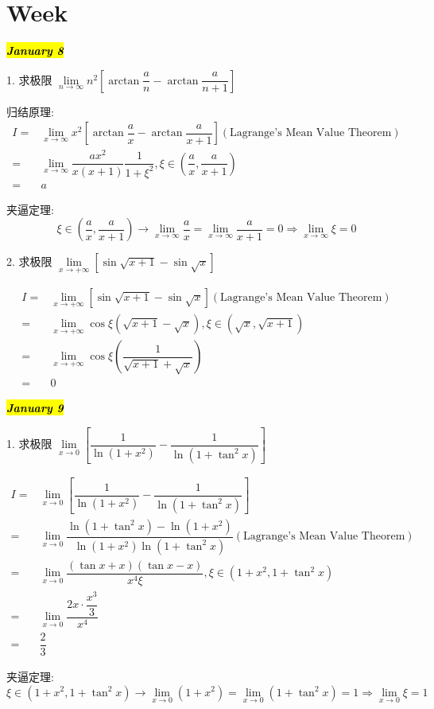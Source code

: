 \section{Week }
\hl{\textbf{\textit{January 8}}}

1. 求极限 $\lim\limits_{n\to \infty}n^{2}\left[\arctan\dfrac{a}{n}-\arctan \dfrac{a}{n+1}\right]$
\begin{solution}
	
	归结原理:
	\begin{align*}
		I = & \lim\limits_{x\to \infty}x^{2}[\arctan\dfrac{a}{x}-\arctan \dfrac{a}{x+1}](\text{Lagrange's Mean Value Theorem})\\
		  = & \lim\limits_{x\to \infty}\dfrac{ax^{2}}{x(x+1)}\dfrac{1}{1+\xi^{2}},\xi\in(\dfrac{a}{x},\dfrac{a}{x+1})\\
		  = & a
	\end{align*}

	夹逼定理: 
	$$\xi\in (\dfrac{a}{x},\dfrac{a}{x+1})\to \lim\limits_{x\to \infty}\dfrac{a}{x} = \lim\limits_{x\to \infty}\dfrac{a}{x+1}=0\Rightarrow \lim\limits_{x\to \infty}\xi = 0$$
\end{solution}

2. 求极限 $\lim\limits_{x\to +\infty}[\sin\sqrt{x+1}-\sin\sqrt{x}]$
\begin{solution}
	
	\begin{align*}
		I = & \lim\limits_{x\to +\infty}[\sin\sqrt{x+1}-\sin\sqrt{x}](\text{Lagrange's Mean Value Theorem})\\
		  = & \lim\limits_{x\to +\infty}\cos \xi(\sqrt{x+1}-\sqrt{x}),\xi\in(\sqrt{x},\sqrt{x+1})\\
		  = & \lim\limits_{x\to +\infty}\cos \xi(\dfrac{1}{\sqrt{x+1}+\sqrt{x}})\\
		  = & 0
	\end{align*}
\end{solution}

\hl{\textbf{\textit{January 9}}}

1. 求极限 $\lim\limits_{x\to 0}\left[\dfrac{1}{\ln(1+x^{2})}-\dfrac{1}{\ln(1+\tan^{2}x)}\right]$
\begin{solution}
	
	\begin{align*}
		I = & \lim\limits_{x\to 0}\left[\dfrac{1}{\ln(1+x^{2})}-\dfrac{1}{\ln(1+\tan^{2}x)}\right]\\
		  = & \lim\limits_{x\to 0}\dfrac{\ln(1+\tan^{2}x)-\ln(1+x^{2})}{\ln(1+x^{2})\ln(1+\tan^{2}x)}(\text{Lagrange's Mean Value Theorem})\\
		  = & \lim\limits_{x\to 0}\dfrac{(\tan x+x)(\tan x-x)}{x^{4}\xi}, \xi\in(1+x^{2},1+\tan^{2}x)\\
		  = & \lim\limits_{x\to 0}\dfrac{2x\cdot \dfrac{x^{3}}{3}}{x^{4}}\\
		  = & \dfrac{2}{3}
	\end{align*}

	夹逼定理: 
	$$\xi\in(1+x^{2},1+\tan^{2}x)\to \lim\limits_{x\to 0}(1+x^{2}) = \lim\limits_{x\to 0} (1+\tan^{2}x) = 1\Rightarrow \lim\limits_{x\to 0}\xi = 1$$
\end{solution}

